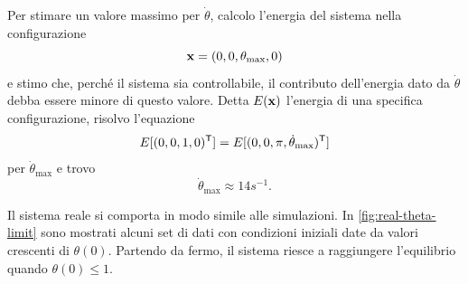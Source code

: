 Per stimare un valore massimo per $\dot \theta$, calcolo l'energia del
sistema nella configurazione
\begin{equation*}
    \mathbf{x} = (0, 0, \theta_{\max}, 0)
\end{equation*}
e stimo che, perché il sistema sia controllabile,
il contributo dell'energia dato da $\dot \theta$ debba essere
minore di questo valore.
Detta $E(\mathbf{x})$ l'energia di una specifica configurazione, risolvo l'equazione
\begin{equation*}
    E[(0, 0, 1, 0)^{\mathsf{T}}] = E[(0, 0, \pi, \dot \theta_{\max})^{\mathsf{T}}]
\end{equation*}
per $\dot \theta_{\max}$ e trovo
\begin{equation*}
    \dot \theta_{\max} \approx 14 s^{-1}.
\end{equation*}

Il sistema reale si comporta in modo simile alle simulazioni.
In \autoref{fig:real-theta-limit} sono mostrati alcuni set di dati
con condizioni iniziali date da valori crescenti di $\theta(0)$.
Partendo da fermo, il sistema riesce a raggiungere l'equilibrio quando
$\theta(0) \leq 1$. 

